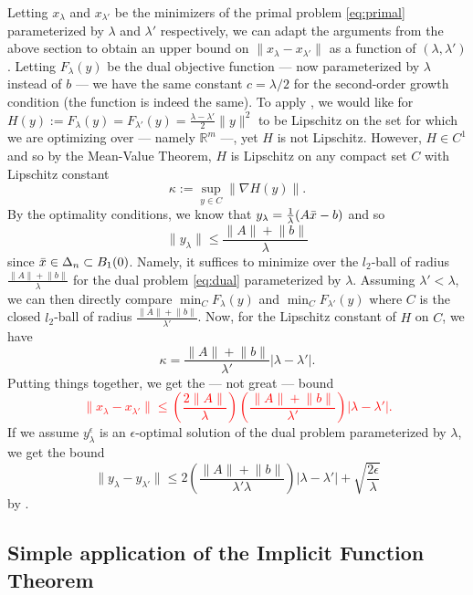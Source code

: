 \documentclass[10pt,a4paper]{article}
\numberwithin{equation}{section}
\theoremstyle{definition}
\def\rr{{\mathbb R}}
\begin{document}
Letting $x_\lambda$ and $x_{\lambda'}$ be the minimizers of the primal problem \eqref{eq:primal} parameterized by $\lambda$ and $\lambda'$ respectively, we can adapt the arguments from the above section to obtain an upper bound on $\lVert x_\lambda - x_{\lambda'} \rVert$ as a function of $(\lambda, \lambda')$. Letting $F_\lambda(y)$ be the dual objective function --- now parameterized by $\lambda$ instead of $b$ --- we have the same constant $c = \lambda / 2$ for the second-order growth condition (the function is indeed the same). To apply \cite[Proposition 4.32]{Bonnans2000}, we would like for $H(y) := F_{\lambda}(y) = F_{\lambda'}(y) = \frac{\lambda - \lambda'}{2}\lVert y \rVert^2$ to be Lipschitz on the set for which we are optimizing over --- namely $\rr^m$ ---, yet $H$ is not Lipschitz. However, $H \in C^1$ and so by the Mean-Value Theorem, $H$ is Lipschitz on any compact set $C$ with Lipschitz constant
\[
\kappa := \sup_{y \in C}\lVert \nabla H(y) \rVert.
\]
By the optimality conditions, we know that $y_\lambda = \frac{1}{\lambda}(A\Bar{x}-b)$ and so 
\[
\lVert y_\lambda \rVert \leq \frac{\lVert A \rVert + \lVert b \rVert}{\lambda} 
\]
since $\Bar{x} \in \Delta_n \subset B_1(0)$. Namely, it suffices to minimize over the $l_2$-ball of radius $\frac{\lVert A \rVert + \lVert b \rVert}{\lambda}$ for the dual problem \eqref{eq:dual} parameterized by $\lambda$. Assuming $\lambda' < \lambda$, we can then directly compare $\min_{C}F_\lambda(y)$ and  $\min_{C}F_{\lambda'}(y)$ where $C$ is the closed $l_2$-ball of radius $\frac{\lVert A \rVert + \lVert b \rVert}{\lambda'}$. Now, for the Lipschitz constant of $H$ on $C$, we have
\[
\kappa = \frac{\lVert A \rVert + \lVert b \rVert}{\lambda'} | \lambda - \lambda' |.
\]
Putting things together, we get the --- not great --- bound 
\textcolor{red}{
\[
\lVert x_\lambda - x_{\lambda'}\lVert \leq \left(\frac{2\lVert A \rVert}{\lambda}\right) \left(\frac{\lVert A \rVert + \lVert b \rVert}{\lambda'}\right) | \lambda - \lambda' |.
\]
}
If we assume $y_\lambda^{\epsilon}$ is an $\epsilon$-optimal solution of the dual problem parameterized by $\lambda$, we get the bound
\[
\lVert y_\lambda - y_{\lambda'}\lVert \leq 2 \left(\frac{\lVert A \rVert + \lVert b \rVert}{\lambda'\lambda}\right) | \lambda - \lambda' | + \sqrt{\frac{2 \epsilon}{\lambda}}
\]
by \cite[Proposition 4.32]{Bonnans2000}.



\subsection{Simple application of the Implicit Function Theorem}
\end{document}
